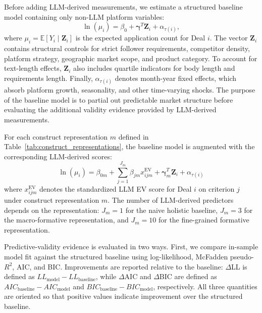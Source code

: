 Before adding LLM-derived measurements, we estimate a structured baseline model containing only non-LLM platform variables:
\begin{equation}\label{eq:barter_base_regression}
    \ln(\mu_i) = \beta_0 + \boldsymbol{\gamma}^{T}\mathbf{Z}_i + \alpha_{\tau(i)},
\end{equation}
where $\mu_i = \mathbb{E}[Y_i \mid \mathbf{Z}_i]$ is the expected application count for Deal $i$. The vector $\mathbf{Z}_i$ contains structural controls for strict follower requirements, competitor density, platform strategy, geographic market scope, and product category. To account for text-length effects, $\mathbf{Z}_i$ also includes quartile indicators for body length and requirements length. Finally, $\alpha_{\tau(i)}$ denotes month-year fixed effects, which absorb platform growth, seasonality, and other time-varying shocks. The purpose of the baseline model is to partial out predictable market structure before evaluating the additional validity evidence provided by LLM-derived measurements.

For each construct representation $m$ defined in Table~\ref{tab:construct_representations}, the baseline model is augmented with the corresponding LLM-derived scores:
\begin{equation}\label{eq:barter_augmented_regression}
    \ln(\mu_i)
    =
    \beta_{0m}
    +
    \sum_{j=1}^{J_m} \beta_{jm} x^{\mathrm{EV}}_{ijm}
    +
    \boldsymbol{\gamma}_{m}^{T}\mathbf{Z}_i
    +
    \alpha_{\tau(i)}
\end{equation}
where $x^{\mathrm{EV}}_{ijm}$ denotes the standardized LLM EV score for Deal $i$ on criterion $j$ under construct representation $m$. The number of LLM-derived predictors depends on the representation: $J_m=1$ for the naive holistic baseline, $J_m=3$ for the macro-formative representation, and $J_m=10$ for the fine-grained formative representation.

Predictive-validity evidence is evaluated in two ways. First, we compare in-sample model fit against the structured baseline using log-likelihood, McFadden pseudo-$R^2$, AIC, and BIC. Improvements are reported relative to the baseline: $\Delta$LL is defined as $LL_{\mathrm{model}} - LL_{\mathrm{baseline}}$, while $\Delta$AIC and $\Delta$BIC are defined as $AIC_{\mathrm{baseline}} - AIC_{\mathrm{model}}$ and $BIC_{\mathrm{baseline}} - BIC_{\mathrm{model}}$, respectively. All three quantities are oriented so that positive values indicate improvement over the structured baseline.

